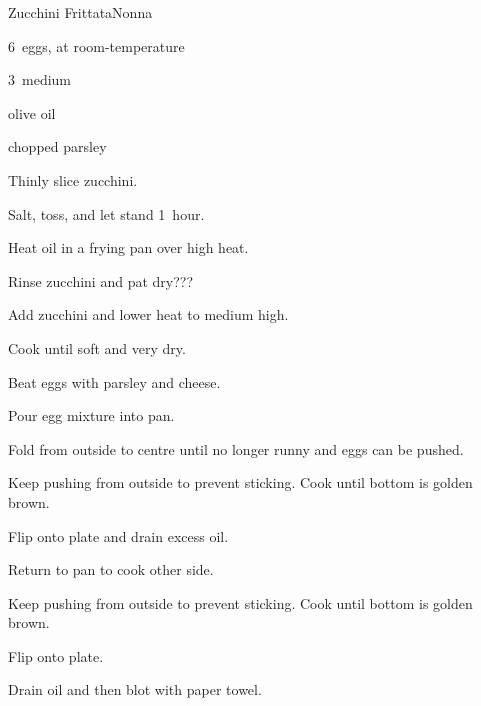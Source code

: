 \begin{recipe}{Zucchini Frittata\FIXME}{Nonna}{}

\begin{ingredients}
\item 6~eggs, at room-temperature
\item 3~medium 
\item olive oil
\item chopped parsley
\item \C{\half} 
\end{ingredients}

\begin{directions}
\item Thinly slice zucchini.
\item Salt, toss, and let stand 1~hour.
\item Heat oil in a  frying pan over high heat.
\item Rinse zucchini and pat dry???
\item Add zucchini and lower heat to medium high.
\item Cook until soft and very dry.
\item Beat eggs with parsley and cheese.
\item Pour egg mixture into pan.
\item Fold from outside to centre until no longer runny and eggs can be pushed.
\item Keep pushing from outside to prevent sticking. Cook until bottom is golden brown.
\item Flip onto plate and drain excess oil.
\item Return to pan to cook other side.
\item Keep pushing from outside to prevent sticking. Cook until bottom is golden brown.
\item Flip onto plate.
\item Drain oil and then blot with paper towel.
\end{directions}

\end{recipe}
